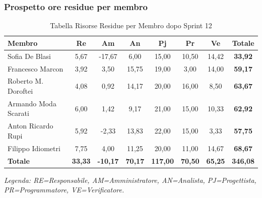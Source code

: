 \subsubsection{Prospetto ore residue per membro}
\begin{table}[H]
    \centering
    \renewcommand{\arraystretch}{1.3}
    \begin{tabularx}{\textwidth}{|X|c|c|c|c|c|c|c|}
        \hline
        \textbf{Membro} & \textbf{Re} & \textbf{Am} & \textbf{An} &
        \textbf{Pj} & \textbf{Pr} & \textbf{Ve} & \textbf{Totale} \\
        \hline
        Sofia De Blasi       &  5,67 & -17,67 &  6,00 & 15,00 & 10,50 & 14,42 & \textbf{33,92} \\
        Francesco Marcon     &  3,92 &   3,50 & 15,75 & 19,00 &  3,00 & 14,00 & \textbf{59,17} \\
        Roberto M. Doroftei  &  4,08 &   0,92 & 14,17 & 20,00 & 16,00 &  8,50 & \textbf{63,67} \\
        Armando Moda Scarati &  6,00 &   1,42 &  9,17 & 21,00 & 15,00 & 10,33 & \textbf{62,92} \\
        Anton Ricardo Rupi   &  5,92 &  -2,33 & 13,83 & 22,00 & 15,00 &  3,33 & \textbf{57,75} \\
        Filippo Idiometri    &  7,75 &   4,00 & 11,25 & 20,00 & 11,00 & 14,67 & \textbf{68,67} \\
        \hline
        \textbf{Totale} &
        \textbf{33,33} & \textbf{-10,17} & \textbf{70,17} &
        \textbf{117,00} & \textbf{70,50} & \textbf{65,25} &
        \textbf{346,08} \\
        \hline
    \end{tabularx}
    \begin{minipage}{\textwidth}
        \smallskip
        \footnotesize\textit{Legenda: RE=Responsabile, AM=Amministratore,
        AN=Analista, PJ=Progettista, PR=Programmatore, VE=Verificatore.}
    \end{minipage}
    \caption{Tabella Risorse Residue per Membro dopo Sprint 12}
\end{table}

